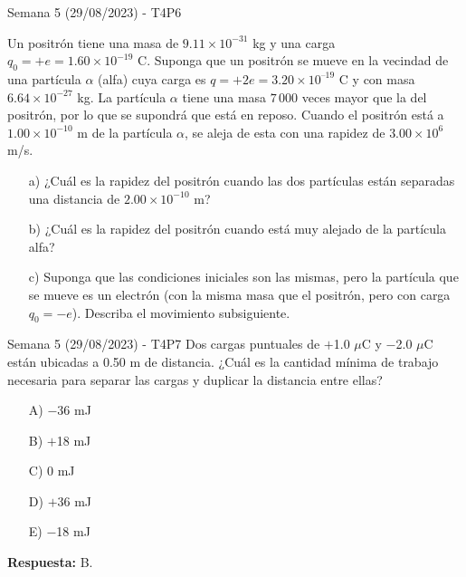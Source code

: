 \begin{frame}{Semana 5 (29/08/2023) - T4P6}

    Un positrón tiene una masa de $9.11\times10^{-31}$ kg y una carga $q_0 = +e = 1.60 \times 10^{-19}$ C. Suponga que un
positrón se mueve en la vecindad de una partícula $\alpha$ (alfa) cuya carga
es $q = +2e = 3.20 \times 10^{–19}$ C y con masa $6.64 \times 10^{-27}$ kg. La partícula $\alpha$
tiene una masa $7\,000$ veces mayor que la del positrón, por lo que se
supondrá que está en reposo. Cuando el positrón está a $1.00 \times 10^{-10}$ m
de la partícula $\alpha$, se aleja de esta con una rapidez de $3.00 \times 10^6$ m/s.

\begin{itemize}
    \item[a)] ¿Cuál es la rapidez del positrón cuando las dos partículas están separadas una distancia de $2.00 \times 10^{-10}$ m?
    \item[b)] ¿Cuál es la rapidez del
positrón cuando está muy alejado de la partícula alfa?
    \item[c)] Suponga
que las condiciones iniciales son las mismas, pero la partícula que se
mueve es un electrón (con la misma masa que el positrón, pero con
carga $q_0 = -e$). Describa el movimiento subsiguiente.
\end{itemize}
    
\end{frame}

\begin{frame}{Semana 5 (29/08/2023) - T4P7}
    Dos cargas puntuales de $+$1.0 $\mu$C y $-$2.0 $\mu$C están ubicadas a 0.50 m de distancia. ¿Cuál es la cantidad mínima de trabajo necesaria para separar las cargas y duplicar la distancia entre ellas?
    
    \begin{itemize}
        \item[A)] $-$36 mJ
        \item[B)] $+$18 mJ
        \item[C)]0 mJ
        \item[D)]$+$36 mJ
        \item[E)]$-$18 mJ
    \end{itemize}
    
    \pause \begin{center}
        \textbf{Respuesta:} B.
    \end{center}
    
\end{frame}

